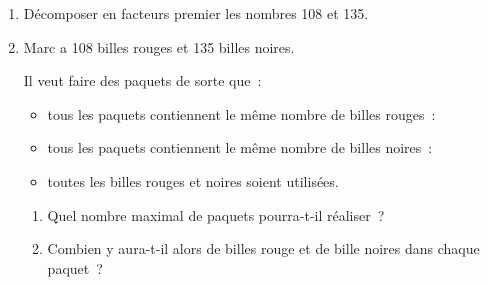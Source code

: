\documentclass[exercice]{thedocument}%
\begin{document}
%
\begin{enumerate}
    \item Décomposer en facteurs premier les nombres 108 et 135.
    \item Marc a 108 billes rouges et 135 billes noires.\par
    Il veut faire des paquets de sorte que~:
    \begin{itemize}
        \item tous les paquets contiennent le même nombre de billes rouges~:
        \item tous les paquets contiennent le même nombre de billes noires~:
        \item toutes les billes rouges et noires soient utilisées.
    \end{itemize}
    \begin{enumerate}
        \item Quel nombre maximal de paquets pourra-t-il réaliser~?
        \item Combien y aura-t-il alors de billes rouge et de bille noires dans chaque paquet~?
    \end{enumerate}
\end{enumerate}
\end{document}
